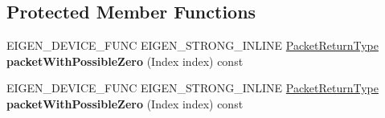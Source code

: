 \subsection*{Protected Member Functions}
\begin{DoxyCompactItemize}
\item 
\mbox{\label{struct_eigen_1_1_tensor_evaluator_3_01const_01_tensor_volume_patch_op_3_01_planes_00_01_rows_00_7868d50e868058a145e213ecbb5a830e_a5136d6e1fe7a9bb2c71bf7e484ab311b}} 
E\+I\+G\+E\+N\+\_\+\+D\+E\+V\+I\+C\+E\+\_\+\+F\+U\+NC E\+I\+G\+E\+N\+\_\+\+S\+T\+R\+O\+N\+G\+\_\+\+I\+N\+L\+I\+NE \hyperlink{group___sparse_core___module}{Packet\+Return\+Type} {\bfseries packet\+With\+Possible\+Zero} (Index index) const
\item 
\mbox{\label{struct_eigen_1_1_tensor_evaluator_3_01const_01_tensor_volume_patch_op_3_01_planes_00_01_rows_00_7868d50e868058a145e213ecbb5a830e_a5136d6e1fe7a9bb2c71bf7e484ab311b}} 
E\+I\+G\+E\+N\+\_\+\+D\+E\+V\+I\+C\+E\+\_\+\+F\+U\+NC E\+I\+G\+E\+N\+\_\+\+S\+T\+R\+O\+N\+G\+\_\+\+I\+N\+L\+I\+NE \hyperlink{group___sparse_core___module}{Packet\+Return\+Type} {\bfseries packet\+With\+Possible\+Zero} (Index index) const
\end{DoxyCompactItemize}
